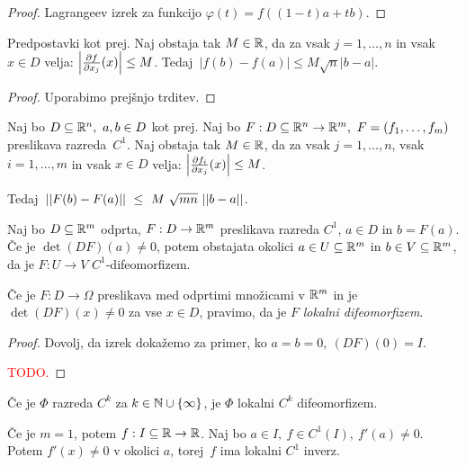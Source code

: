 \begin{proof}
    Lagrangeev izrek za funkcijo $\varphi(t) = f((1-t)a + tb)$.
\end{proof}

\begin{lema}
    Predpostavki kot prej. Naj obstaja tak $M \in \mathbb{R}$, da za vsak $j = 1, \ldots, n$ in vsak $x \in D$ velja: $\left|\frac{\partial f}{\partial x_j}(x)\right| \leq M$. Tedaj~$|f(b)-f(a)| \leq M \sqrt{n}|b-a|$.
\end{lema}

\begin{proof}
    Uporabimo prejšnjo trditev.
\end{proof}

\begin{lema}
    Naj bo $D \subseteq \mathbb{R}^n, \ a,b \in D$ kot prej. Naj bo $F: D \subseteq \mathbb{R}^n \to \mathbb{R}^m, \ F = (f_1, \ldots, f_m)$ preslikava razreda~$C^1$. Naj obstaja tak $M \in \mathbb{R}$, da za vsak $j = 1, \ldots, n$, vsak $i = 1, \ldots, m$ in vsak $x \in D$ velja: $\left|\frac{\partial f_i}{\partial x_j}(x)\right| \leq M$. 
    
    Tedaj~$||F(b) - F(a)||~\leq~M~\sqrt{mn}~||b - a||$.
\end{lema}

\begin{izrek}
    Naj bo $D \subseteq \mathbb{R}^m$ odprta, $F: D \to \mathbb{R}^m$ preslikava razreda $C^1$,  $a \in D$ in $b = F(a)$.
    Če je $\det(DF)(a) \neq 0$, potem obstajata okolici $a \in U \subseteq \mathbb{R}^m$ in $b \in V \subseteq \mathbb{R}^m$, da je $F: U \to V$ $C^1$-difeomorfizem.    
\end{izrek}

\begin{definicija}
    Če je $F: D \to \Omega$ preslikava med odprtimi množicami v $\mathbb{R}^m$ in je $\det(DF)(x) \neq 0$ za vse $x \in D$, pravimo, da je $F$ \emph{lokalni difeomorfizem}.
\end{definicija}

\begin{proof}
    Dovolj, da izrek dokažemo za primer, ko $a=b=0, \ (DF)(0) = I$.

    \textcolor{red}{TODO.}
\end{proof}

\begin{posledica}
    Če je $\Phi$ razreda $C^k$ za $k \in \mathbb{N} \cup \left\{\infty\right\}$, je $\Phi$ lokalni $C^k$ difeomorfizem.
\end{posledica}

\begin{opomba}
    Če je $m=1$, potem $f: I \subseteq \mathbb{R} \to \mathbb{R}$. Naj bo $a \in I, \ f \in C^1(I), \ f'(a) \neq 0$. Potem $f'(x) \neq 0$ v okolici $a$, torej~$f$ ima lokalni $C^1$ inverz.
\end{opomba}

